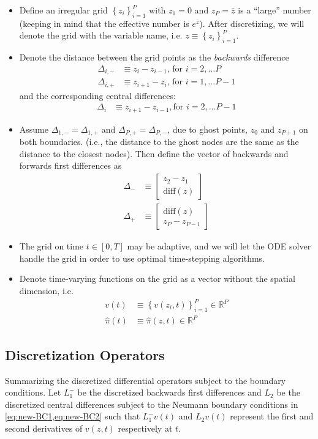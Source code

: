 \documentclass[11pt]{article}
\newcommand{\R}{\ensuremath{\mathbb{R}}}
\newcommand{\set}[1]{\ensuremath{\left\{{#1}\right\}}}
\begin{document}
\begin{itemize}
	\item Define an irregular  grid $\set{z_i}_{i=1}^P$ with $z_1 = 0$ and $z_P = \bar{z}$ is a ``large'' number (keeping in mind that the effective number is $e^{\bar{z}}$).  After discretizing, we will denote the grid with the variable name, i.e. $z \equiv \set{z_i}_{i=1}^P$.
	\item Denote the distance between the grid points as the \textit{backwards} difference
	\begin{align}
	\Delta_{i,-} &\equiv z_i - z_{i-1},\, \text{for } i = 2,\ldots P\\
	\Delta_{i,+} &\equiv z_{i+1} - z_i,\, \text{for } i = 1,\ldots P-1
	\end{align}
	and the corresponding central differences:
	\begin{align}
	\Delta_{i} &\equiv z_{i+1} - z_{i-1}, \text{for } i = 2, \ldots P-1
	\end{align}
	\item Assume $\Delta_{1, -} = \Delta_{1, +}$ and $\Delta_{P, +} = \Delta_{P, -}$, due to ghost points, $z_0$ and $z_{P+1}$ on both boundaries. (i.e., the distance to the ghost nodes are the same as the distance to the closest nodes).  Then define the vector of backwards and forwards first differences as
	\begin{align}
	\Delta_{-} &\equiv \begin{bmatrix} z_2 - z_1 \\
	\text{diff}(z)
	\end{bmatrix}\\
	\Delta_{+} &\equiv \begin{bmatrix} \text{diff}(z)\\
	z_P - z_{P-1}
	\end{bmatrix}
	\end{align}
	\item The grid on time $t \in [0,T]$ may be adaptive, and we will let the ODE solver handle the grid in order to use optimal time-stepping algorithms.
	\item Denote time-varying functions on the grid as a vector without the spatial dimension, i.e. 
	\begin{align}
	v(t) &\equiv \set{v(z_i, t)}_{i=1}^P\in\R^P\\
	\hat{\pi}(t) &\equiv	\hat{\pi}(z,t) \in \R^P
	\end{align}
\end{itemize}

\subsection{Discretization Operators}\label{sec:discretization-operators}
Summarizing the discretized differential operators subject to the boundary conditions.  Let $L_1^{-}$ be the discretized backwards first differences and $L_2$ be the discretized central differences subject to the Neumann boundary conditions in \cref{eq:new-BC1,eq:new-BC2} such that $L_1^{-} v(t)$ and $L_2 v(t)$ represent the first and second derivatives of $v(z,t)$ respectively at $t$.
\end{document}

